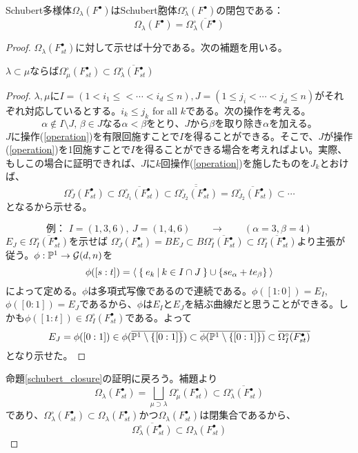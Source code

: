 \documentclass{ltjsreport}
\begin{document}
\begin{prop}\label{schubert_closure}
  Schubert多様体$\Omega_{\lambda}(F^\bullet)$はSchubert胞体$\Omega_{\lambda}^\circ(F^\bullet)$の閉包である：
  \[
    \Omega_{\lambda}(F^\bullet)=\overline{\Omega_{\lambda}^\circ(F^\bullet)}
  \]
\end{prop}

\begin{proof}
  $\Omega_{\lambda}(F^{\bullet}_{st})$に対して示せば十分である。次の補題を用いる。
  \begin{lemm}
    $\lambda\subset\mu$ならば$\Omega_{\mu}^\circ(F^\bullet_{st})\subset\overline{\Omega_{\lambda}^\circ(F^\bullet_{st})}$
  \end{lemm}

  \begin{proof}
    $\lambda,\mu$に$I=(1<i_1\leq <\cdots< i_d\leq n),J=(1\leq j_i<\cdots<j_d\leq n)$がそれぞれ対応しているとする。$i_k\leq j_k$ for all $k$である。次の操作を考える。
    \begin{equation}\label{operation}
    \text{$\alpha\notin I\setminus J$, $\beta\in J$なる$\alpha <\beta$をとり、$J$から$\beta$を取り除き$\alpha$を加える。}
    \end{equation}
    $J$に操作(\ref{operation})を有限回施すことで$I$を得ることができる。そこで、$J$が操作(\ref{operation})を1回施すことで$I$を得ることができる場合を考えればよい。実際、もしこの場合に証明できれば、$J$に$k$回操作(\ref{operation})を施したものを$J_k$とおけば、
    \[
    \Omega_{J}^\circ(F^\bullet_{st})
    \subset\overline{\Omega_{J_1}^\circ(F^\bullet_{st})}\subset\overline{\overline{\Omega_{J_2}^\circ(F^\bullet_{st})}}=\overline{\Omega_{J_2}^\circ(F^\bullet_{st})}  
    \subset\cdots
    \]
    となるから示せる。

    \[
    \text{例： }I=(1,3,6),\: J=(1,4,6)\qquad\rightarrow\qquad (\alpha=3,\beta=4)
    \]
    $E_J\in \overline{\Omega_{I}^\circ(F^\bullet_{st})}$を示せば
    $\Omega_{J}^\circ(F^\bullet_{st})
    =BE_J\subset B\overline{\Omega_{I}^\circ(F^\bullet_{st})}\subset \overline{\Omega_{I}^\circ(F^\bullet_{st})}$より主張が従う。$\phi:\mathbb{P}^1\rightarrow \mathcal{G}(d,n)$を
    \[
    \phi([s:t])=\langle\:\left\{\:e_k\:\middle|\:k\in I\cap J\:\right\}\cup\{se_{\alpha}+te_{\beta}\}\:\rangle  
    \]
    によって定める。$\phi$は多項式写像であるので連続である。$\phi([1:0])=E_I$, $\phi([0:1])=E_J$であるから、$\phi$は$E_I$と$E_J$を結ぶ曲線だと思うことができる。しかも$\phi([1:t])\in \Omega_{I}^\circ(F^\bullet_{st})$である。よって
    \[
    E_J=\phi([0:1])\in\phi(\overline{\mathbb{P}^1\setminus\{[0:1]\}})
    \subset\overline{\phi(\mathbb{P}^1\setminus\{[0:1]\})}\subset\overline{\Omega_{I}^\circ(F^\bullet_{st})}
    \]
    となり示せた。
  \end{proof}

  命題\ref{schubert_closure}の証明に戻ろう。補題より
  \[
  \Omega_{\lambda}(F^\bullet_{st})
  =\bigsqcup_{\mu\supset\lambda}\Omega_{\mu}^\circ(F^\bullet_{st})  
  \subset
  \overline{\Omega_{\lambda}^\circ(F^\bullet_{st})}
  \]
  であり、$\Omega_{\lambda}^\circ(F^\bullet_{st})\subset\Omega_{\lambda}(F^\bullet_{st})$かつ$\Omega_{\lambda}(F^\bullet_{st})$は閉集合であるから、
  \[
    \overline{\Omega_{\lambda}^\circ(F^\bullet_{st})}\subset\Omega_{\lambda}(F^\bullet_{st})  
  \]
\end{proof}
\end{document}
